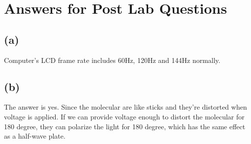 \documentclass[12pt]{article}
\begin{document}
\newpage
\section{Answers for Post Lab Questions}
\subsection{(a)}
Computer's LCD frame rate includes 60Hz, 120Hz and 144Hz normally.
\subsection{(b)}
The answer is yes. Since the molecular are like sticks and they're distorted when voltage is applied. If we can provide voltage enough to distort the molecular for 180 degree, they can polarize the light for 180 degree, which has the same effect as a half-wave plate. 
\end{document}
